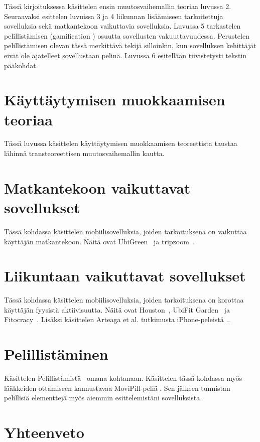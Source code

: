\documentclass[finnish]{tktltiki2}
\theoremstyle{definition}
\theoremstyle{remark}
\begin{document}
Tässä kirjoituksessa käsittelen ensin muutosvaihemallin teoriaa luvussa 2.
Seuraavaksi esittelen luvuissa 3 ja 4 liikunnan lisäämiseen tarkoitettuja sovelluksia sekä matkantekoon vaikuttavia sovelluksia.
Luvussa 5 tarkastelen pelillistämisen (gamification \cite{gamification}) osuutta sovellusten vakuuttavuudessa.
Perustelen pelillistämisen olevan tässä merkittävä tekijä silloinkin, kun sovelluksen kehittäjät eivät ole ajatelleet sovellustaan pelinä.
Luvussa 6 esitellään tiivistetysti tekstin pääkohdat.

\section{Käyttäytymisen muokkaamisen teoriaa}

Tässä luvussa käsittelen käyttäytymisen muokkaamisen teoreettista taustaa lähinnä transteoreettisen muutosvaihemallin \cite{ttm} kautta.

\section{Matkantekoon vaikuttavat sovellukset}

Tässä kohdassa käsittelen mobiilisovelluksia, joiden tarkoituksena on vaikuttaa käyttäjän matkantekoon. Näitä ovat UbiGreen~\cite{ubigreen} ja tripzoom~\cite{tripzoom}.

\section{Liikuntaan vaikuttavat sovellukset}

Tässä kohdassa käsittelen mobiilisovelluksia, joiden tarkoituksena on korottaa käyttäjän fyysistä aktiivisuutta. Näitä ovat Houston~\cite{houston}, UbiFit Garden~\cite{ubifit} ja Fitocracy~\cite{fitocracy}. Lisäksi käsittelen Arteaga et al. tutkimusta iPhone-peleistä \cite{obesity}..

\section{Pelillistäminen}

Käsittelen Pelillistämistä~\cite{gamification} omana kohtanaan. Käsittelen tässä kohdassa myös lääkkeiden ottamiseen kannustavaa MoviPill-peliä \cite{movipill}.
Sen jälkeen tunnistan pelillisiä elementtejä myös aiemmin esittelemistäni sovelluksista.

\section{Yhteenveto}
\end{document}
